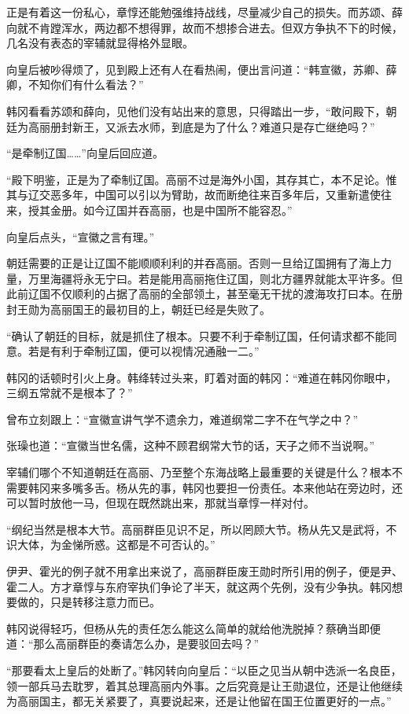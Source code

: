 正是有着这一份私心，章惇还能勉强维持战线，尽量减少自己的损失。而苏颂、薛向就不肯蹚浑水，两边都不想得罪，故而不想掺合进去。但双方争执不下的时候，几名没有表态的宰辅就显得格外显眼。

向皇后被吵得烦了，见到殿上还有人在看热闹，便出言问道：“韩宣徽，苏卿、薛卿，不知你们有什么看法？”

韩冈看看苏颂和薛向，见他们没有站出来的意思，只得踏出一步，“敢问殿下，朝廷为高丽册封新王，又派去水师，到底是为了什么？难道只是存亡继绝吗？”

“是牵制辽国……”向皇后回应道。

“殿下明鉴，正是为了牵制辽国。高丽不过是海外小国，其存其亡，本不足论。惟其与辽交恶多年，中国可以引以为臂助，故而断绝往来百多年后，又重新遣使往来，授其金册。如今辽国并吞高丽，也是中国所不能容忍。”

向皇后点头，“宣徽之言有理。”

朝廷需要的正是让辽国不能顺顺利利的并吞高丽。否则一旦给辽国拥有了海上力量，万里海疆将永无宁曰。若是能用高丽拖住辽国，则北方疆界就能太平许多。但此前辽国不仅顺利的占据了高丽的全部领土，甚至毫无干扰的渡海攻打曰本。在册封王勋为高丽国王的最初目的上，朝廷已经是失败了。

“确认了朝廷的目标，就是抓住了根本。只要不利于牵制辽国，任何请求都不能同意。若是有利于牵制辽国，便可以视情况通融一二。”

韩冈的话顿时引火上身。韩绛转过头来，盯着对面的韩冈：“难道在韩冈你眼中，三纲五常就不是根本了？”

曾布立刻跟上：“宣徽宣讲气学不遗余力，难道纲常二字不在气学之中？”

张璪也道：“宣徽当世名儒，这种不顾君纲常大节的话，天子之师不当说啊。”

宰辅们哪个不知道朝廷在高丽、乃至整个东海战略上最重要的关键是什么？根本不需要韩冈来多嘴多舌。杨从先的事，韩冈也要担一份责任。本来他站在旁边时，还可以暂时放他一马，但现在既然跳出来，那就当章惇一样对付。

“纲纪当然是根本大节。高丽群臣见识不足，所以罔顾大节。杨从先又是武将，不识大体，为金悌所惑。这都是不可否认的。”

伊尹、霍光的例子就不用拿出来说了，高丽群臣废王勋时所引用的例子，便是尹、霍二人。方才章惇与东府宰执们争论了半天，就这两个先例，没有少争执。韩冈想要做的，只是转移注意力而已。

韩冈说得轻巧，但杨从先的责任怎么能这么简单的就给他洗脱掉？蔡确当即便道：“那么高丽群臣的奏请怎么办，是要驳回去吗？”

“那要看太上皇后的处断了。”韩冈转向向皇后：“以臣之见当从朝中选派一名良臣，领一部兵马去耽罗，着其总理高丽内外事。之后究竟是让王勋退位，还是让他继续为高丽国主，都无关紧要了，真要说起来，还是让他留在国王位置更好的一点。”

